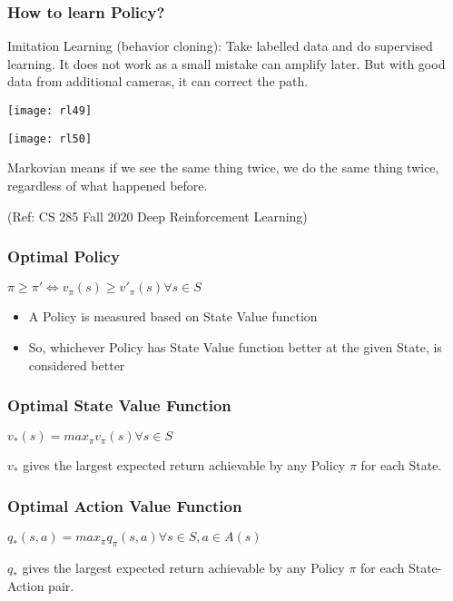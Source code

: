 \begin{frame}[fragile]\frametitle{How to learn Policy?}

Imitation Learning (behavior cloning): Take labelled data and do supervised learning. It does not work as a small mistake can amplify later. But with good data from additional cameras, it can correct the path.


\begin{center}
\texttt{[image: rl49]}

\texttt{[image: rl50]}

\end{center}

Markovian means if we see the same thing twice, we do the same thing twice, regardless of what happened before.


{\tiny (Ref: CS 285 Fall 2020 Deep Reinforcement Learning)}

\end{frame}


\begin{frame}[fragile]\frametitle{Optimal Policy}

$\pi \geq \pi' \iff v_{\pi}(s) \geq {v'}_{\pi}(s) \forall s \in S$

\begin{itemize}
\item A Policy is measured based on State Value function
\item So, whichever Policy has State Value function better at the given State, is considered better
\end{itemize}

\end{frame}

\begin{frame}[fragile]\frametitle{Optimal State Value Function}

$v_{*}(s) = max_{\pi} v_{\pi}(s) \forall s \in S$

$v_{*}$ gives the largest expected return achievable by any Policy $\pi$ for each State.

\end{frame}

\begin{frame}[fragile]\frametitle{Optimal Action Value Function}

$q_{*}(s,a) = max_{\pi} q_{\pi}(s,a) \forall s \in S, a \in A(s)$

$q_{*}$ gives the largest expected return achievable by any Policy $\pi$ for each State-Action pair.

\end{frame}

